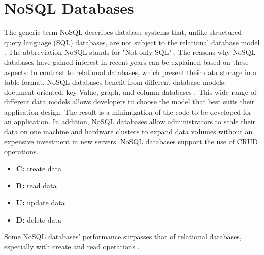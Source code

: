 \section{NoSQL Databases}
The generic term NoSQL describes database systems that, unlike structured query language (SQL) databases, are not subject to the relational database model \cite{.mongonosql}. The abbreviation NoSQL stands for "Not only SQL" \cite{.mongonosql}. The reasons why NoSQL databases have gained interest in recent years can be explained based on these aspects: In contrast to relational databases, which present their data storage in a table format, NoSQL databases benefit from different database models: document-oriented, key Value, graph, and column databases \cite{.mongonosql}. This wide range of different data models allows developers to choose the model that best suits their application design. The result is a minimization of the code to be developed for an application. In addition, NoSQL databases allow administrators to scale their data on one machine and hardware clusters to expand data volumes without an expensive investment in new servers. NoSQL databases support the use of CRUD operations.
\begin{itemize}
	\item \textbf{C:} create data
	\item \textbf{R:} read data
	\item \textbf{U:} update data
	\item \textbf{D:} delete data
\end{itemize}
Some NoSQL databases' performance surpasses that of relational databases, especially with create and read operations \cite{.crud}.
